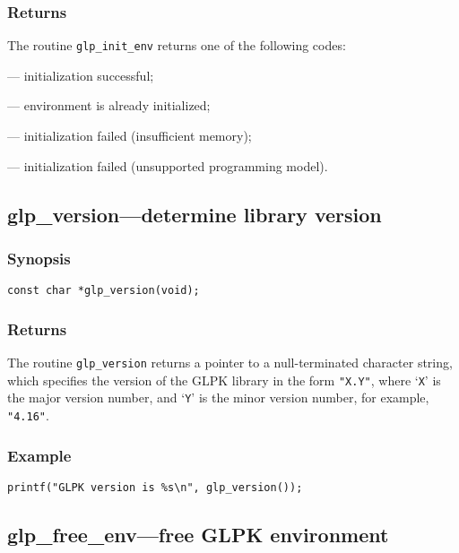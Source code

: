 \subsubsection*{Returns}

The routine \verb|glp_init_env| returns one of the following codes:

 --- initialization successful;

 --- environment is already initialized;

 --- initialization failed (insufficient memory);

 --- initialization failed (unsupported programming model).

\subsection{glp\_version---determine library version}

\subsubsection*{Synopsis}

\begin{verbatim}
const char *glp_version(void);
\end{verbatim}

\subsubsection*{Returns}

The routine \verb|glp_version| returns a pointer to a null-terminated
character string, which specifies the version of the GLPK library in
the form \verb|"X.Y"|, where `\verb|X|' is the major version number, and
`\verb|Y|' is the minor version number, for example, \verb|"4.16"|.

\subsubsection*{Example}

\begin{footnotesize}
\begin{verbatim}
printf("GLPK version is %s\n", glp_version());
\end{verbatim}
\end{footnotesize}

\subsection{glp\_free\_env---free GLPK environment}


